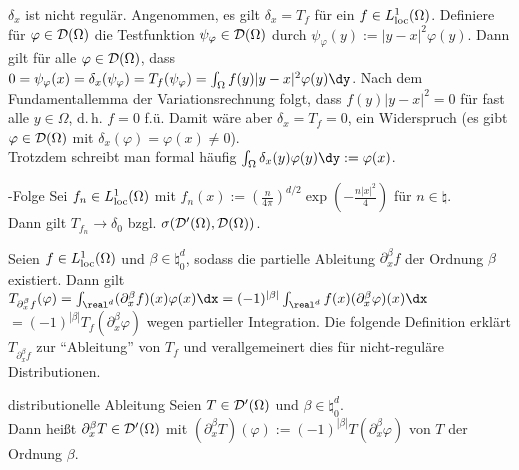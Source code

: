 \begin{Bem}
    $\delta_x$ ist nicht regulär.
    Angenommen, es gilt $\delta_x = T_f$ für ein $f \in L^1_{\text{loc}}(\Omega)$.
    Definiere für $\varphi \in \mathcal{D}(\Omega)$ die Testfunktion
    $\psi_\varphi \in \mathcal{D}(\Omega)$ durch $\psi_\varphi(y) := |y - x|^2 \varphi(y)$.
    Dann gilt für alle $\varphi \in \mathcal{D}(\Omega)$, dass
    $0 = \psi_\varphi(x) = \delta_x(\psi_\varphi) = T_f(\psi_\varphi) =
    \int_\Omega f(y) |y - x|^2 \varphi(y) \dy$.
    Nach dem Fundamentallemma der Variationsrechnung folgt,
    dass $f(y) |y - x|^2 = 0$ für fast alle $y \in \Omega$, d.\,h. $f = 0$ f.ü.
    Damit wäre aber $\delta_x = T_f = 0$, ein Widerspruch
    (es gibt $\varphi \in \mathcal{D}(\Omega)$ mit $\delta_x(\varphi) = \varphi(x) \not= 0$).\\
    Trotzdem schreibt man formal häufig
    $\int_\Omega \delta_x(y) \varphi(y) \dy := \varphi(x)$.
\end{Bem}

\begin{Satz}{-Folge}
    Sei $f_n \in L^1_{\text{loc}}(\Omega)$ mit
    $f_n(x) := \left(\frac{n}{4\pi}\right)^{d/2} \exp\!\left(-\frac{n|x|^2}{4}\right)$
    für $n \in \natural$.\\
    Dann gilt $T_{f_n} \to \delta_0$ bzgl. $\sigma(\mathcal{D}'(\Omega), \mathcal{D}(\Omega))$.
\end{Satz}

\linie

\begin{Bem}
    Seien $f \in L^1_{\text{loc}}(\Omega)$ und $\beta \in \natural_0^d$, sodass
    die partielle Ableitung $\partial^\beta_x f$ der Ordnung $\beta$ existiert.
    Dann gilt $T_{\partial^\beta_x f}(\varphi)
    = \int_{\real^d} (\partial^\beta_x f)(x) \varphi(x) \dx
    = (-1)^{|\beta|} \int_{\real^d} f(x) (\partial^\beta_x \varphi)(x) \dx$\\
    $= (-1)^{|\beta|} T_f(\partial^\beta_x \varphi)$ wegen partieller Integration.
    Die folgende Definition erklärt $T_{\partial^\beta_x f}$ zur "`Ableitung"' von $T_f$
    und verallgemeinert dies für nicht-reguläre Distributionen.
\end{Bem}

\begin{Def}{distributionelle Ableitung}
    Seien $T \in \mathcal{D}'(\Omega)$ und $\beta \in \natural_0^d$.\\
    Dann heißt $\partial^\beta_x T \in \mathcal{D}'(\Omega)$ mit
    $(\partial^\beta_x T)(\varphi) := (-1)^{|\beta|} T(\partial^\beta_x \varphi)$
     von $T$ der Ordnung $\beta$.
\end{Def}

